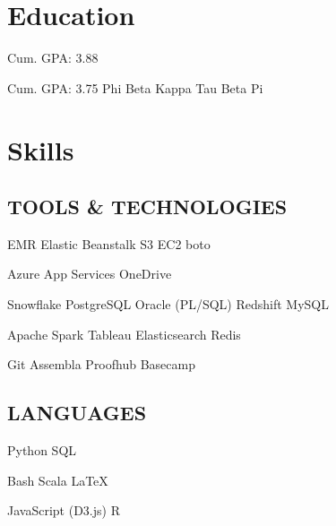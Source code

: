 \documentclass[]{deedy-resume-openfont}
\begin{document}
\section{Education}
Cum. GPA: 3.88
\sectionsep

Cum. GPA: 3.75 \textbullet{} Phi Beta Kappa \textbullet{} Tau Beta Pi
\sectionsep

\section{Skills}
\begin{minipage}[t]{.5\textwidth}
\subsection{TOOLS \& TECHNOLOGIES}

EMR \textbullet{} Elastic Beanstalk \textbullet{} S3 \textbullet{} EC2 \textbullet{} boto

Azure App Services \textbullet{} OneDrive

Snowflake \textbullet{} PostgreSQL \textbullet{} Oracle (PL/SQL) \textbullet{} Redshift \textbullet{} MySQL

Apache Spark \textbullet{} Tableau \textbullet{} Elasticsearch \textbullet{} Redis%

Git \textbullet{} Assembla \textbullet{} Proofhub \textbullet{} Basecamp%

\end{minipage}
\hfill
\begin{minipage}[t]{.4\textwidth}
\subsection{LANGUAGES}

Python \textbullet{} SQL

Bash \textbullet{} Scala \textbullet{} \LaTeX

JavaScript (D3.js) \textbullet{} R

\end{minipage}
\end{document}
